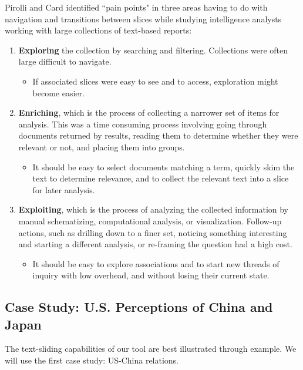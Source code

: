 \documentclass{sig-alternate}
\newcommand{\strong}[1] {\textbf{#1}}
\begin{document}
Pirolli and Card \cite{pirolli_sensemaking_2005} identified ``pain points" in three areas having to do with navigation and transitions between slices while studying intelligence analysts working with large collections of text-based reports:
\begin{enumerate}
\item \strong{Exploring} the collection by searching and filtering. Collections were often large difficult to navigate. 
	\begin{itemize}
		\item If  associated slices were easy to see and to access, exploration might become easier. 
	\end{itemize}
\item \strong{Enriching}, which is the process of collecting a narrower set of items for analysis. This was a time consuming process involving going through documents returned by results, reading them to determine whether they were relevant or not, and placing them into groups.
	\begin{itemize}
		\item It should be easy to select documents matching a term, quickly skim the text to determine relevance, and to collect the relevant text into a slice for later analysis.
	\end{itemize}
\item \strong{Exploiting}, which is the process of analyzing the collected information by manual schematizing, computational analysis, or visualization. Follow-up actions, such as drilling down to a finer set, noticing something interesting and starting a different analysis, or re-framing the question had a high cost.
	\begin{itemize}
		\item It should be easy to explore associations and to start new threads of inquiry with low overhead, and without losing their current state.
	\end{itemize}
\end{enumerate}

\subsection{Case Study: U.S. Perceptions of China and Japan}

The text-sliding capabilities of our tool are best illustrated through example. We will use the first case study:  US-China relations.
\end{document}
